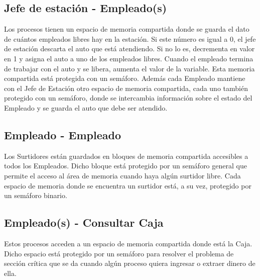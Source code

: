 \documentclass{article}
\begin{document}
\subsection{Jefe de estación - Empleado(s)}
Los procesos tienen un espacio de memoria compartida donde se guarda el dato de cuántos empleados libres hay en la estación. Si este número es igual a 0, el jefe de estación descarta el auto que está atendiendo. Si no lo es, decrementa en valor en 1 y asigna el auto a uno de los empleados libres. Cuando el empleado termina de trabajar con el auto y se libera, aumenta el valor de la variable. Esta memoria compartida está protegida con un semáforo.
Además cada Empleado mantiene con el Jefe de Estación otro espacio de memoria compartida, cada uno también protegido con un semáforo, donde se intercambia información sobre el estado del Empleado y se guarda el auto que debe ser atendido.
\subsection{Empleado - Empleado}
Los Surtidores están guardados en bloques de memoria compartida accesibles a todos los Empleados. Dicho bloque está protegido por un semáforo general que permite el acceso al área de memoria cuando haya algún surtidor libre. Cada espacio de memoria donde se encuentra un surtidor está, a su vez, protegido por un semáforo binario.
\subsection{Empleado(s) - Consultar Caja}
Estos procesos acceden a un espacio de memoria compartida donde está la Caja. Dicho espacio está protegido por un semáforo para resolver el problema de sección crítica que se da cuando algún proceso quiera ingresar o extraer dinero de ella.
					
\end{document}
